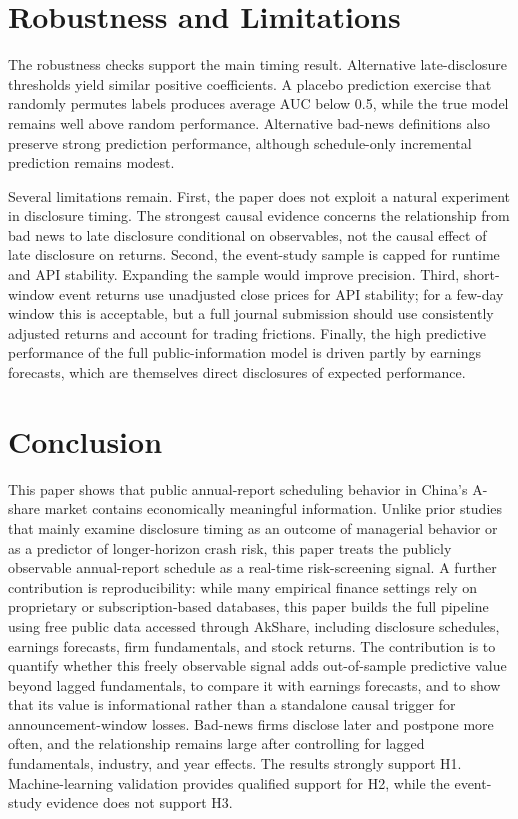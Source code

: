 \documentclass[10pt]{article}
\begin{document}
\section{Robustness and Limitations}

The robustness checks support the main timing result. Alternative late-disclosure thresholds yield similar positive coefficients. A placebo prediction exercise that randomly permutes labels produces average AUC below 0.5, while the true model remains well above random performance. Alternative bad-news definitions also preserve strong prediction performance, although schedule-only incremental prediction remains modest.

Several limitations remain. First, the paper does not exploit a natural experiment in disclosure timing. The strongest causal evidence concerns the relationship from bad news to late disclosure conditional on observables, not the causal effect of late disclosure on returns. Second, the event-study sample is capped for runtime and API stability. Expanding the sample would improve precision. Third, short-window event returns use unadjusted close prices for API stability; for a few-day window this is acceptable, but a full journal submission should use consistently adjusted returns and account for trading frictions. Finally, the high predictive performance of the full public-information model is driven partly by earnings forecasts, which are themselves direct disclosures of expected performance.

\section{Conclusion}

This paper shows that public annual-report scheduling behavior in China's A-share market contains economically meaningful information. Unlike prior studies that mainly examine disclosure timing as an outcome of managerial behavior or as a predictor of longer-horizon crash risk, this paper treats the publicly observable annual-report schedule as a real-time risk-screening signal. A further contribution is reproducibility: while many empirical finance settings rely on proprietary or subscription-based databases, this paper builds the full pipeline using free public data accessed through AkShare, including disclosure schedules, earnings forecasts, firm fundamentals, and stock returns. The contribution is to quantify whether this freely observable signal adds out-of-sample predictive value beyond lagged fundamentals, to compare it with earnings forecasts, and to show that its value is informational rather than a standalone causal trigger for announcement-window losses. Bad-news firms disclose later and postpone more often, and the relationship remains large after controlling for lagged fundamentals, industry, and year effects. The results strongly support H1. Machine-learning validation provides qualified support for H2, while the event-study evidence does not support H3.
\end{document}
